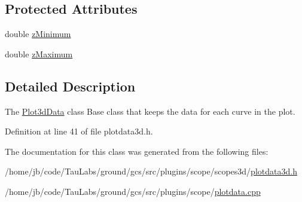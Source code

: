 \subsection*{\-Protected \-Attributes}
\begin{DoxyCompactItemize}
\item 
double \hyperlink{group___scope_plugin_ga0938aa53ec304cabf25b8294dde0a5b0}{z\-Minimum}
\item 
double \hyperlink{group___scope_plugin_ga1ad4417e8b0fb7035d1f4c85191812a0}{z\-Maximum}
\end{DoxyCompactItemize}


\subsection{\-Detailed \-Description}
\-The \hyperlink{class_plot3d_data}{\-Plot3d\-Data} class \-Base class that keeps the data for each curve in the plot. 

\-Definition at line 41 of file plotdata3d.\-h.



\-The documentation for this class was generated from the following files\-:\begin{DoxyCompactItemize}
\item 
/home/jb/code/\-Tau\-Labs/ground/gcs/src/plugins/scope/scopes3d/\hyperlink{plotdata3d_8h}{plotdata3d.\-h}\item 
/home/jb/code/\-Tau\-Labs/ground/gcs/src/plugins/scope/\hyperlink{plotdata_8cpp}{plotdata.\-cpp}\end{DoxyCompactItemize}

